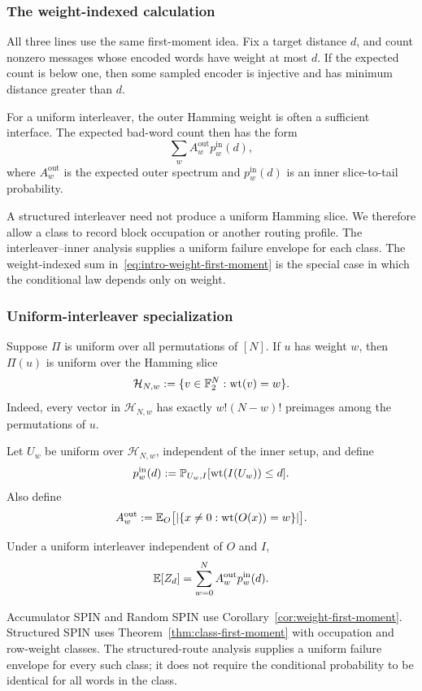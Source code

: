 \subsubsection{The weight-indexed calculation}

All three lines use the same first-moment idea. Fix a target distance $d$,
and count nonzero messages whose encoded words have weight at most $d$.
If the expected count is below one, then some sampled encoder is injective and
has minimum distance greater than $d$.

For a uniform interleaver, the outer Hamming weight is often a sufficient
interface. The expected bad-word count then has the form
\begin{equation}
  \sum_w A_w^{\mathrm{out}}p_w^{\mathrm{in}}(d),
  \label{eq:intro-weight-first-moment}
\end{equation}
where $A_w^{\mathrm{out}}$ is the expected outer spectrum and
$p_w^{\mathrm{in}}(d)$ is an inner slice-to-tail probability.

A structured interleaver need not produce a uniform Hamming slice. We
therefore allow a class to record block occupation or another routing profile.
The interleaver--inner analysis supplies a uniform failure envelope for each
class. The weight-indexed sum in~\eqref{eq:intro-weight-first-moment} is the
special case in which the conditional law depends only on weight.

\subsubsection{Uniform-interleaver specialization}

Suppose $\Pi$ is uniform over all permutations of $[N]$. If $u$ has
weight $w$, then $\Pi(u)$ is uniform over the Hamming slice
\[
  \mathcal H_{N,w}:=\{v\in\mathbb F_2^N:\operatorname{wt}(v)=w\}.
\]
Indeed, every vector in $\mathcal H_{N,w}$ has exactly
$w!(N-w)!$ preimages among the permutations of $u$.

Let $U_w$ be uniform over $\mathcal H_{N,w}$, independent of the inner
setup, and define
\begin{equation}
  p_w^{\mathrm{in}}(d)
  :=
  \mathbb P_{U_w,I}[\operatorname{wt}(I(U_w))\le d].
  \label{eq:inner-slice-tail}
\end{equation}
Also define
\[
  A_w^{\mathrm{out}}
  :=
  \mathbb E_O\bigl[
    |\{x\ne0:\operatorname{wt}(O(x))=w\}|
  \bigr].
\]

\begin{corollary}
\label{cor:weight-first-moment}
Under a uniform interleaver independent of $O$ and $I$,
\[
  \mathbb E[Z_d]
  =
  \sum_{w=0}^N
  A_w^{\mathrm{out}}p_w^{\mathrm{in}}(d).
\]
\end{corollary}

Accumulator SPIN and Random SPIN use
Corollary~\ref{cor:weight-first-moment}. Structured SPIN uses
Theorem~\ref{thm:class-first-moment} with occupation and row-weight classes.
The structured-route analysis supplies a uniform failure envelope for every
such class; it does not require the conditional probability to be identical
for all words in the class.
